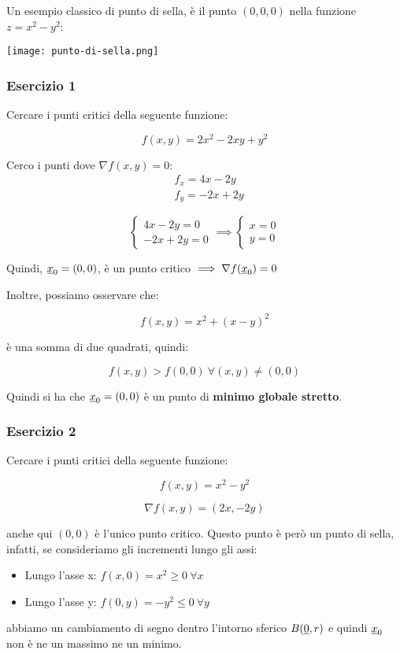 Un esempio classico di punto di sella, è il punto \((0,0,0)\) nella funzione \(z=x^2-y^2\):
\begin{center}
    \texttt{[image: punto-di-sella.png]}
\end{center}

\filbreak{}
\subsubsection*{Esercizio 1}

Cercare i punti critici della seguente funzione:

\[
    f(x,y) = 2x^{2} - 2xy +y^{2}
\]

Cerco i punti dove \(\nabla f(x,y) = 0\):
\begin{align*}
     & f_x = 4x -2y  \\
     & f_y = -2x +2y
\end{align*}

\[
    \begin{cases}
        4x -2y = 0 \\
        -2x +2y = 0
    \end{cases}
    \implies
    \begin{cases}
        x = 0 \\
        y = 0
    \end{cases}
\]

Quindi, \(\underline{x}_0 = (0,0)\), è un punto critico \(\implies \nabla f(\underline{x}_0)=0\)

Inoltre, possiamo osservare che:

\[
    f(x,y) = x^{2} + {(x-y)}^{2}
\]

è una somma di due quadrati, quindi:

\[
    f(x,y) > f(0,0) ~\forall (x,y) \neq (0,0)
\]

Quindi si ha che \(\underline{x}_0 = (0,0)\) è un punto di \textbf{minimo globale stretto}.

\subsubsection*{Esercizio 2}

Cercare i punti critici della seguente funzione:

\[
    f(x,y) = x^{2}-y^{2}
\]

\[
    \nabla f(x,y) = (2x, -2y)
\]

anche qui \((0,0)\) è l'unico punto critico. Questo punto è però un punto di sella, infatti, se consideriamo gli incrementi lungo gli assi:
\begin{itemize}
    \item Lungo l'asse x: \(f(x,0) = x^{2} \ge 0 ~\forall x\)
    \item Lungo l'asse y: \(f(0,y) = -y^{2} \le 0 ~\forall y\)
\end{itemize}
abbiamo un cambiamento di segno dentro l'intorno sferico \(B(\underline{0}, r)\) e quindi \(\underline{x}_0\) non è ne un massimo ne un minimo.

